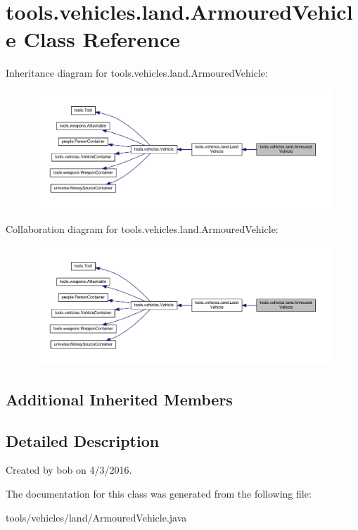 \hypertarget{classtools_1_1vehicles_1_1land_1_1_armoured_vehicle}{}\section{tools.\+vehicles.\+land.\+Armoured\+Vehicle Class Reference}
\label{classtools_1_1vehicles_1_1land_1_1_armoured_vehicle}


Inheritance diagram for tools.\+vehicles.\+land.\+Armoured\+Vehicle\+:\nopagebreak
\begin{figure}[H]
\begin{center}
\leavevmode
\includegraphics[width=350pt]{classtools_1_1vehicles_1_1land_1_1_armoured_vehicle__inherit__graph}
\end{center}
\end{figure}


Collaboration diagram for tools.\+vehicles.\+land.\+Armoured\+Vehicle\+:\nopagebreak
\begin{figure}[H]
\begin{center}
\leavevmode
\includegraphics[width=350pt]{classtools_1_1vehicles_1_1land_1_1_armoured_vehicle__coll__graph}
\end{center}
\end{figure}
\subsection*{Additional Inherited Members}


\subsection{Detailed Description}
Created by bob on 4/3/2016. 

The documentation for this class was generated from the following file\+:\begin{DoxyCompactItemize}
\item 
tools/vehicles/land/Armoured\+Vehicle.\+java\end{DoxyCompactItemize}
